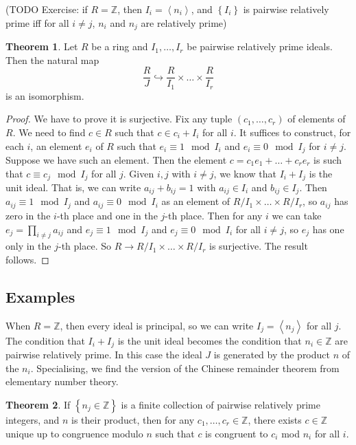 \documentclass{article}
\newcommand{\Z}{\mathbb{Z}}
\newcommand{\rb}[1]{\left( #1 \right)}
\newcommand{\cb}[1]{\left\{ #1 \right\}}
\newcommand{\ab}[1]{\left\langle #1 \right\rangle}
\theoremstyle{definition}\newtheorem{definition}{Definition}[section]
\theoremstyle{definition}\newtheorem{remark}[definition]{Remark}
\theoremstyle{definition}\newtheorem*{example}{Example}
\theoremstyle{definition}\newtheorem*{note}{Note}
\newtheorem{theorem}[definition]{Theorem}
\begin{document}
(TODO Exercise: if $ R = \Z $, then $ I_i = \ab{n_i} $, and $ \cb{I_i} $ is pairwise relatively prime iff for all $ i \ne j $, $ n_i $ and $ n_j $ are relatively prime)

\begin{theorem}
Let $ R $ be a ring and $ I_1, \dots, I_r $ be pairwise relatively prime ideals. Then the natural map
$$ \dfrac{R}{J} \hookrightarrow \dfrac{R}{I_1} \times \dots \times \dfrac{R}{I_r} $$
is an isomorphism.
\end{theorem}

\begin{proof}
We have to prove it is surjective. Fix any tuple $ \rb{c_1, \dots, c_r} $ of elements of $ R $. We need to find $ c \in R $ such that $ c \in c_i + I_i $ for all $ i $. It suffices to construct, for each $ i $, an element $ e_i $ of $ R $ such that $ e_i \equiv 1 \mod I_i $ and $ e_i \equiv 0 \mod I_j $ for $ i \ne j $. Suppose we have such an element. Then the element $ c = c_1e_1 + \dots + c_re_r $ is such that $ c \equiv c_j \mod I_j $ for all $ j $. Given $ i, j $ with $ i \ne j $, we know that $ I_i + I_j $ is the unit ideal. That is, we can write $ a_{ij} + b_{ij} = 1 $ with $ a_{ij} \in I_i $ and $ b_{ij} \in I_j $. Then $ a_{ij} \equiv 1 \mod I_j $ and $ a_{ij} \equiv 0 \mod I_i $ as an element of $ R / I_1 \times \dots \times R / I_r $, so $ a_{ij} $ has zero in the $ i $-th place and one in the $ j $-th place. Then for any $ i $ we can take $ e_j = \prod_{i \ne j} a_{ij} $ and $ e_j \equiv 1 \mod I_j $ and $ e_j \equiv 0 \mod I_i $ for all $ i \ne j $, so $ e_j $ has one only in the $ j $-th place. So $ R \to R / I_1 \times \dots \times R / I_r $ is surjective. The result follows.
\end{proof}

\subsection{Examples}

When $ R = \Z $, then every ideal is principal, so we can write $ I_j = \ab{n_j} $ for all $ j $. The condition that $ I_i + I_j $ is the unit ideal becomes the condition that $ n_i \in \Z $ are pairwise relatively prime. In this case the ideal $ J $ is generated by the product $ n $ of the $ n_i $. Specialising, we find the version of the Chinese remainder theorem from elementary number theory.

\begin{theorem}
If $ \cb{n_j \in \Z} $ is a finite collection of pairwise relatively prime integers, and $ n $ is their product, then for any $ c_1, \dots, c_r \in \Z $, there exists $ c \in \Z $ unique up to congruence modulo $ n $ such that $ c $ is congruent to $ c_i $ mod $ n_i $ for all $ i $.
\end{theorem}
\end{document}
